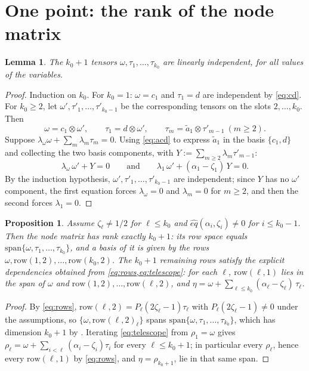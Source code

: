 \documentclass{article}
\newtheorem{lemma}{Lemma}
\newtheorem{proposition}{Proposition}
\theoremstyle{definition}
\begin{document}
\section{One point: the rank of the node matrix}\label{sec:rank}

\begin{lemma}\label{lem:tau}
The $k_0 + 1$ tensors $\omega, \tau_1, \dots, \tau_{k_0}$ are linearly independent, for all values of the variables.
\end{lemma}

\begin{proof}
Induction on $k_0$. For $k_0 = 1$: $\omega = c_1$ and $\tau_1 = d$ are independent by \cref{eq:cd}. For $k_0 \ge 2$, let $\omega', \tau'_1, \dots, \tau'_{k_0 - 1}$ be the corresponding tensors on the slots $2, \dots, k_0$. Then
\[
\omega = c_1 \otimes \omega', \qquad \tau_1 = d \otimes \omega', \qquad \tau_m = \tilde{a}_1 \otimes \tau'_{m - 1} \ (m \ge 2) .
\]
Suppose $\lambda_\omega \omega + \sum_m \lambda_m \tau_m = 0$. Using \cref{eq:acd} to express $\tilde{a}_1$ in the basis $\{c_1, d\}$ and collecting the two basis components, with $Y := \sum_{m \ge 2} \lambda_m \tau'_{m-1}$:
\[
\lambda_\omega\, \omega' + Y = 0 \qquad \text{and} \qquad \lambda_1\, \omega' + (\alpha_1 - \zeta_1)\, Y = 0 .
\]
By the induction hypothesis, $\omega', \tau'_1, \dots, \tau'_{k_0-1}$ are independent; since $Y$ has no $\omega'$ component, the first equation forces $\lambda_\omega = 0$ and $\lambda_m = 0$ for $m \ge 2$, and then the second forces $\lambda_1 = 0$.
\end{proof}

\begin{proposition}\label{prop:rank}
Assume $\zeta_\ell \neq 1/2$ for $\ell \le k_0$ and $\hat{eq}(\alpha_i, \zeta_i) \neq 0$ for $i \le k_0 - 1$. Then the node matrix has rank exactly $k_0 + 1$: its row space equals $\mathrm{span}\{\omega, \tau_1, \dots, \tau_{k_0}\}$, and a basis of it is given by the rows $\omega, \mathrm{row}(1,2), \dots, \mathrm{row}(k_0, 2)$. The $k_0 + 1$ remaining rows satisfy the explicit dependencies obtained from \cref{eq:rows,eq:telescope}: for each $\ell$, $\mathrm{row}(\ell, 1)$ lies in the span of $\omega$ and $\mathrm{row}(1,2), \dots, \mathrm{row}(\ell, 2)$, and $\eta = \omega + \sum_{\ell \le k_0} (\alpha_\ell - \zeta_\ell)\, \tau_\ell$.
\end{proposition}

\begin{proof}
By \cref{eq:rows}, $\mathrm{row}(\ell, 2) = P_\ell (2\zeta_\ell - 1) \tau_\ell$ with $P_\ell(2\zeta_\ell - 1) \neq 0$ under the assumptions, so $\{\omega, \mathrm{row}(\ell,2)_\ell\}$ spans $\mathrm{span}\{\omega, \tau_1, \dots, \tau_{k_0}\}$, which has dimension $k_0 + 1$ by . Iterating \cref{eq:telescope} from $\rho_1 = \omega$ gives $\rho_\ell = \omega + \sum_{i < \ell}(\alpha_i - \zeta_i)\tau_i$ for every $\ell \le k_0 + 1$; in particular every $\rho_\ell$, hence every $\mathrm{row}(\ell, 1)$ by \cref{eq:rows}, and $\eta = \rho_{k_0+1}$, lie in that same span.
\end{proof}
\end{document}

